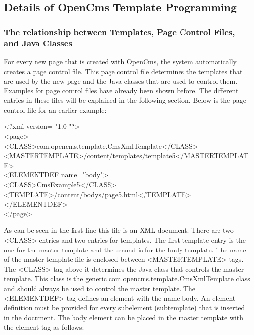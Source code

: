 \subsection{Details of OpenCms Template Programming}
\subsubsection{The relationship between Templates, Page Control Files, and
Java Classes}

For every new page that is created with OpenCms, the system
automatically creates a page control file. This {\name page control file}
determines the templates that are used by the new page and the Java
classes that are used to control them. Examples for page control files
have already been shown before. The different entries in these files
will be explained in the following section.
Below is the page control file for an earlier example:

\begin{xml}
<?xml version= "1.0 "?>\\
<page>\\
\xtaba <CLASS>com.opencms.template.CmsXmlTemplate</CLASS>\\
\xtaba <MASTERTEMPLATE>/content/templates/template5</MASTERTEMPLATE>\\
\xtaba <ELEMENTDEF name="body">\\
\xtaba <CLASS>CmsExample5</CLASS>\\
\xtaba <TEMPLATE>/content/bodys/page5.html</TEMPLATE>\\
\xtaba </ELEMENTDEF>\\
</page>\\
\end{xml}

As can be seen in the first line this file is an XML document. There
are two {\class <CLASS>} entries and two entries for templates. The first
template entry is the one for the master template and the second is for
the body template. The name of the master template file is enclosed
between {\tag <MASTERTEMPLATE>} tags. The {\tag <CLASS>} tag above it determines the
Java class that controls the master template. This class is the  generic
{\class com.opencms.template.CmsXmlTemplate} class and should always be used to
control the master template. The {\tag <ELEMENTDEF>} tag defines an element
with the name {\name body.} An element definition must be provided for every
subelement (subtemplate) that is inserted in the document. The body
element can be placed in the master template with the element tag as
follows:

